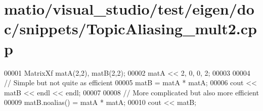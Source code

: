 \hypertarget{matio_2visual__studio_2test_2eigen_2doc_2snippets_2_topic_aliasing__mult2_8cpp_source}{}\section{matio/visual\+\_\+studio/test/eigen/doc/snippets/\+Topic\+Aliasing\+\_\+mult2.cpp}
\label{matio_2visual__studio_2test_2eigen_2doc_2snippets_2_topic_aliasing__mult2_8cpp_source}

\begin{DoxyCode}
00001 MatrixXf matA(2,2), matB(2,2); 
00002 matA << 2, 0,  0, 2;
00003 
00004 \textcolor{comment}{// Simple but not quite as efficient}
00005 matB = matA * matA;
00006 cout << matB << endl << endl;
00007 
00008 \textcolor{comment}{// More complicated but also more efficient}
00009 matB.noalias() = matA * matA;
00010 cout << matB;
\end{DoxyCode}
